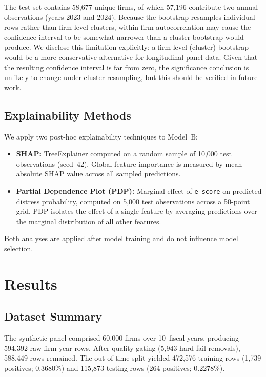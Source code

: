 \documentclass[sigconf,anonymous]{acmart}
\begin{document}
The test set contains 58,677 unique firms, of which 57,196 contribute two annual observations (years 2023 and 2024). Because the bootstrap resamples individual rows rather than firm-level clusters, within-firm autocorrelation may cause the confidence interval to be somewhat narrower than a cluster bootstrap would produce. We disclose this limitation explicitly: a firm-level (cluster) bootstrap would be a more conservative alternative for longitudinal panel data. Given that the resulting confidence interval is far from zero, the significance conclusion is unlikely to change under cluster resampling, but this should be verified in future work.

\subsection{Explainability Methods}
We apply two post-hoc explainability techniques to Model~B:
\begin{itemize}
    \item \textbf{SHAP:} TreeExplainer \cite{lundberg2017} computed on a random sample of 10,000 test observations (seed~42). Global feature importance is measured by mean absolute SHAP value across all sampled predictions.
    \item \textbf{Partial Dependence Plot (PDP):} Marginal effect of \texttt{e\_score} on predicted distress probability, computed on 5,000 test observations across a 50-point grid. PDP isolates the effect of a single feature by averaging predictions over the marginal distribution of all other features.
\end{itemize}
Both analyses are applied after model training and do not influence model selection.


\section{Results}

\subsection{Dataset Summary}
The synthetic panel comprised 60,000 firms over 10~fiscal years, producing 594,392 raw firm-year rows. After quality gating (5,943 hard-fail removals), 588,449 rows remained. The out-of-time split yielded 472,576 training rows (1,739 positives; 0.3680\%) and 115,873 testing rows (264 positives; 0.2278\%).
\end{document}
